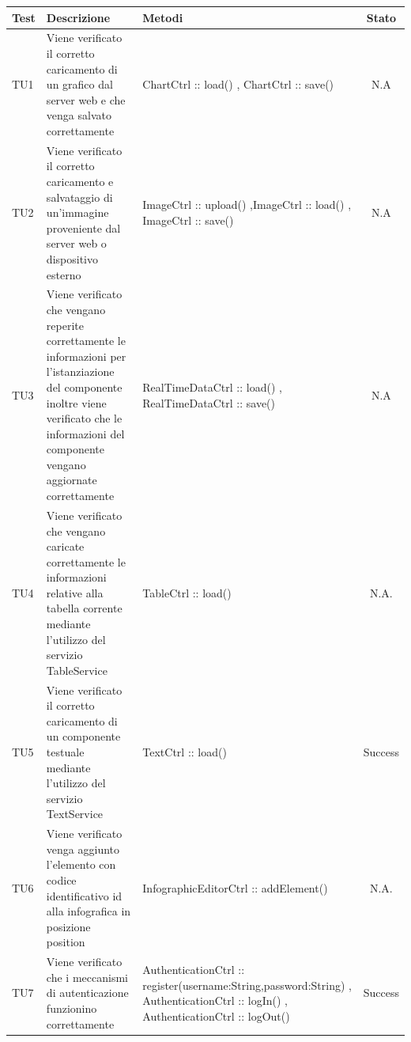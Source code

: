 \begin{table}[h]
	\begin{center}
	\begin{tabular}{|l|p{}|p{}|c|}
	\toprule
		\textbf{Test} & \textbf{Descrizione} & \textbf{Metodi} & \textbf{Stato}\\
		
	\midrule
		TU1 & Viene verificato il corretto caricamento di un grafico dal server web e che venga salvato correttamente & ChartCtrl :: load() , ChartCtrl :: save() & N.A\\
	\midrule
		TU2 & Viene verificato il corretto caricamento e salvataggio di un'immagine proveniente dal server web o dispositivo esterno & ImageCtrl :: upload() ,ImageCtrl :: load() , ImageCtrl :: save() & N.A\\
	\midrule
		TU3 & Viene verificato che vengano reperite correttamente le informazioni per l'istanziazione del componente inoltre viene verificato che le informazioni del componente vengano aggiornate correttamente & RealTimeDataCtrl :: load() , RealTimeDataCtrl :: save() & N.A\\
	\midrule
		TU4 & Viene verificato che vengano caricate correttamente le informazioni relative alla tabella corrente mediante  l'utilizzo del servizio  TableService & TableCtrl :: load() & N.A.\\
	\midrule
		TU5 & Viene verificato il corretto caricamento di un componente testuale  mediante l'utilizzo del servizio
TextService & TextCtrl :: load() & Success\\
	\midrule
		TU6 & Viene verificato venga aggiunto l'elemento con codice identificativo id alla infografica
in posizione position & InfographicEditorCtrl :: addElement() & N.A.\\
	\midrule
		TU7 & Viene verificato che i meccanismi di autenticazione funzionino correttamente & AuthenticationCtrl :: register(username:String,password:String) , AuthenticationCtrl :: logIn() , AuthenticationCtrl :: logOut() & Success\\
\bottomrule
\end{tabular}
\end{center}
\end{table}
